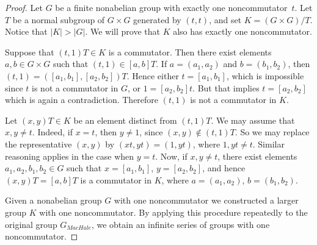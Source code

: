 \documentclass[10pt,a4paper]{amsart}
\begin{document}
\begin{proof}
	Let \( G \) be a finite nonabelian group with exactly one noncommutator~\( t \).
	Let \( T \) be a normal subgroup of \( G \times G \) generated by \( (t, t) \), and set \( K = (G \times G)/T \).
	Notice that \( |K| > |G| \). We will prove that \( K \) also has exactly one noncommutator.

	Suppose that \( (t, 1)T \in K \) is a commutator. Then there exist elements \( a, b \in G \times G \)
	such that \( (t, 1) \in [a, b]T \). If \( a = (a_1, a_2) \) and \( b = (b_1, b_2) \), then
	\( (t, 1) = ([a_1, b_1], [a_2, b_2])T \). Hence either \( t = [a_1, b_1] \), which is impossible since \( t \)
	is not a commutator in \( G \), or \( 1 = [a_2, b_2]t \). But that implies \( t = [a_2, b_2] \) which is again a contradiction.
	Therefore \( (t, 1) \) is not a commutator in \( K \).

	Let \( (x, y)T \in K \) be an element distinct from \( (t, 1)T \).
	We may assume that \( x, y \neq t \). Indeed, if \( x = t \), then \( y \neq 1 \), since \( (x, y) \not\in (t, 1)T \).
	So we may replace the representative \( (x, y) \) by \( (xt, yt) = (1, yt) \), where \( 1, yt \neq t \).
	Similar reasoning applies in the case when \( y = t \). Now, if \( x, y \neq t \), there exist elements \( a_1, a_2, b_1, b_2 \in G \)
	such that \( x = [a_1, b_1] \), \( y = [a_2, b_2] \), and hence \( (x, y)T = [a, b]T \) is a commutator in \( K \),
	where \( a = (a_1, a_2) \), \( b = (b_1, b_2) \).

	Given a nonabelian group \( G \) with one noncommutator we constructed a larger group \( K \) with one noncommutator.
	By applying this procedure repeatedly to the original group \( G_{MacHale} \), we obtain an infinite series of groups with one noncommutator.
\end{proof}
\end{document}
